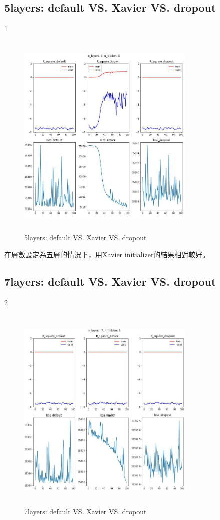 \documentclass[conference,twocolumn]{IEEEtran}
\theoremstyle{definition}
\begin{document}
\begin{singlespace}

\subsection{5layers: default VS. Xavier VS. dropout}\ref{f2}
\begin{figure}
\centerline{\includegraphics[width=8.5cm, height=10cm]{f2.jpg}}
\caption{5layers: default VS. Xavier VS. dropout}
\label{f2}
\end{figure}
\end{singlespace}
\begin{singlespace}
在層數設定為五層的情況下，用Xavier initializer的結果相對較好。
\end{singlespace}
\begin{singlespace}

\subsection{7layers: default VS. Xavier VS. dropout}\ref{f3}
\begin{figure}
\centerline{\includegraphics[width=8.5cm, height=10cm]{f3.jpg}}
\caption{7layers: default VS. Xavier VS. dropout}
\label{f3}
\end{figure}
\end{singlespace}
\end{document}
